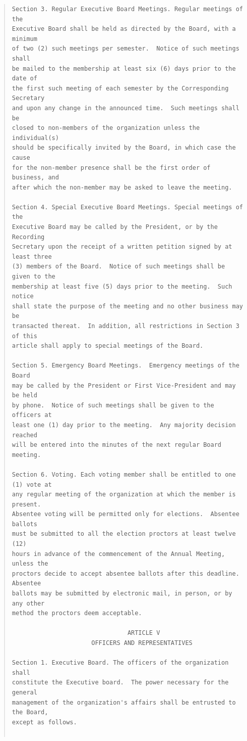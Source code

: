 \documentclass{article}
\begin{document}
\begin{quote}
\begin{verbatim}
Section 3. Regular Executive Board Meetings. Regular meetings of the
Executive Board shall be held as directed by the Board, with a minimum
of two (2) such meetings per semester.  Notice of such meetings shall
be mailed to the membership at least six (6) days prior to the date of
the first such meeting of each semester by the Corresponding Secretary
and upon any change in the announced time.  Such meetings shall be
closed to non-members of the organization unless the individual(s)
should be specifically invited by the Board, in which case the cause
for the non-member presence shall be the first order of business, and
after which the non-member may be asked to leave the meeting.

Section 4. Special Executive Board Meetings. Special meetings of the
Executive Board may be called by the President, or by the Recording
Secretary upon the receipt of a written petition signed by at least three
(3) members of the Board.  Notice of such meetings shall be given to the
membership at least five (5) days prior to the meeting.  Such notice
shall state the purpose of the meeting and no other business may be
transacted thereat.  In addition, all restrictions in Section 3 of this
article shall apply to special meetings of the Board.

Section 5. Emergency Board Meetings.  Emergency meetings of the Board
may be called by the President or First Vice-President and may be held
by phone.  Notice of such meetings shall be given to the officers at
least one (1) day prior to the meeting.  Any majority decision reached
will be entered into the minutes of the next regular Board meeting.

Section 6. Voting. Each voting member shall be entitled to one (1) vote at
any regular meeting of the organization at which the member is present.
Absentee voting will be permitted only for elections.  Absentee ballots
must be submitted to all the election proctors at least twelve (12)
hours in advance of the commencement of the Annual Meeting, unless the
proctors decide to accept absentee ballots after this deadline. Absentee
ballots may be submitted by electronic mail, in person, or by any other
method the proctors deem acceptable.

                                ARTICLE V
                      OFFICERS AND REPRESENTATIVES

Section 1. Executive Board. The officers of the organization shall
constitute the Executive board.  The power necessary for the general
management of the organization's affairs shall be entrusted to the Board,
except as follows.


\end{verbatim}
\end{quote}
\end{document}
